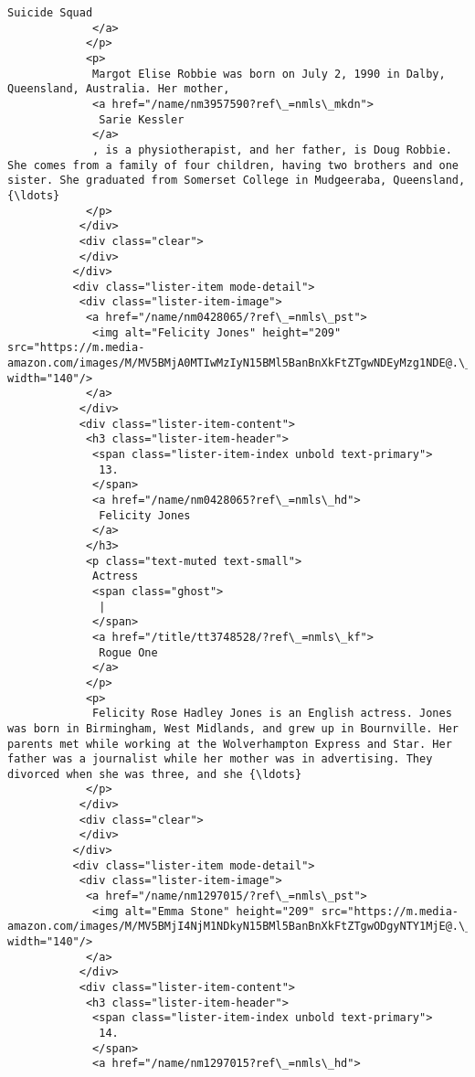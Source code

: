 \documentclass[11pt]{article}
\begin{document}
\begin{Verbatim}[commandchars=\\\{\}]
              Suicide Squad
             </a>
            </p>
            <p>
             Margot Elise Robbie was born on July 2, 1990 in Dalby, Queensland, Australia. Her mother,
             <a href="/name/nm3957590?ref\_=nmls\_mkdn">
              Sarie Kessler
             </a>
             , is a physiotherapist, and her father, is Doug Robbie. She comes from a family of four children, having two brothers and one sister. She graduated from Somerset College in Mudgeeraba, Queensland,{\ldots}
            </p>
           </div>
           <div class="clear">
           </div>
          </div>
          <div class="lister-item mode-detail">
           <div class="lister-item-image">
            <a href="/name/nm0428065/?ref\_=nmls\_pst">
             <img alt="Felicity Jones" height="209" src="https://m.media-amazon.com/images/M/MV5BMjA0MTIwMzIyN15BMl5BanBnXkFtZTgwNDEyMzg1NDE@.\_V1\_UX140\_CR0,0,140,209\_AL\_.jpg" width="140"/>
            </a>
           </div>
           <div class="lister-item-content">
            <h3 class="lister-item-header">
             <span class="lister-item-index unbold text-primary">
              13.
             </span>
             <a href="/name/nm0428065?ref\_=nmls\_hd">
              Felicity Jones
             </a>
            </h3>
            <p class="text-muted text-small">
             Actress
             <span class="ghost">
              |
             </span>
             <a href="/title/tt3748528/?ref\_=nmls\_kf">
              Rogue One
             </a>
            </p>
            <p>
             Felicity Rose Hadley Jones is an English actress. Jones was born in Birmingham, West Midlands, and grew up in Bournville. Her parents met while working at the Wolverhampton Express and Star. Her father was a journalist while her mother was in advertising. They divorced when she was three, and she {\ldots}
            </p>
           </div>
           <div class="clear">
           </div>
          </div>
          <div class="lister-item mode-detail">
           <div class="lister-item-image">
            <a href="/name/nm1297015/?ref\_=nmls\_pst">
             <img alt="Emma Stone" height="209" src="https://m.media-amazon.com/images/M/MV5BMjI4NjM1NDkyN15BMl5BanBnXkFtZTgwODgyNTY1MjE@.\_V1..\_UX140\_CR0,0,140,209\_AL\_.jpg" width="140"/>
            </a>
           </div>
           <div class="lister-item-content">
            <h3 class="lister-item-header">
             <span class="lister-item-index unbold text-primary">
              14.
             </span>
             <a href="/name/nm1297015?ref\_=nmls\_hd">

\end{Verbatim}
\end{document}
